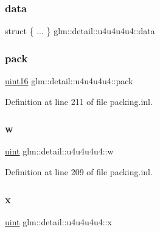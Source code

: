 \subsubsection{\texorpdfstring{data}{data}}
{\footnotesize\ttfamily struct \{ ... \}   glm\+::detail\+::u4u4u4u4\+::data}

\mbox{\label{unionglm_1_1detail_1_1u4u4u4u4_aa989a8fab51b41be68d0d07147fba3b8}} 
\subsubsection{\texorpdfstring{pack}{pack}}
{\footnotesize\ttfamily \mbox{\hyperlink{namespaceglm_1_1detail_a47b2a7d006d187338e8031a352d1ce56}{uint16}} glm\+::detail\+::u4u4u4u4\+::pack}



Definition at line 211 of file packing.\+inl.

\mbox{\label{unionglm_1_1detail_1_1u4u4u4u4_a7a6644d1d5c02008e670d714d26124af}} 
\subsubsection{\texorpdfstring{w}{w}}
{\footnotesize\ttfamily \mbox{\hyperlink{group__core__precision_ga4fd29415871152bfb5abd588334147c8}{uint}} glm\+::detail\+::u4u4u4u4\+::w}



Definition at line 209 of file packing.\+inl.

\mbox{\label{unionglm_1_1detail_1_1u4u4u4u4_a41dd5af8fc599a451d74967a2c97e750}} 
\subsubsection{\texorpdfstring{x}{x}}
{\footnotesize\ttfamily \mbox{\hyperlink{group__core__precision_ga4fd29415871152bfb5abd588334147c8}{uint}} glm\+::detail\+::u4u4u4u4\+::x}



